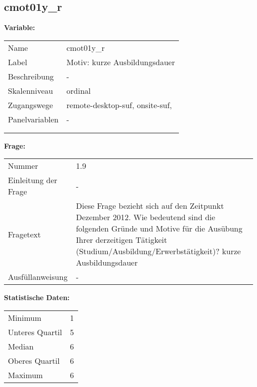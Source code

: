 	
	
	\subsection{cmot01y\_r}
	\label{subSection:cmot01y_r}

	\noindent\textbf{Variable:}\\
		\begin{tabular}{lL{11.3cm}}
			\label{tableVariable:cmot01y_r}
			Name & cmot01y\_r \\
			Label & Motiv: kurze Ausbildungsdauer \\
			Beschreibung & - \\
			Skalenniveau & ordinal \\
			Zugangswege &
				remote-desktop-suf,
				onsite-suf,
 \\
			Panelvariablen & -
			 \\
			 \\
 \\
		\end{tabular}

		\vspace*{1 cm}
		\noindent\textbf{Frage:}\\
		\begin{tabular}{lL{11.3cm}}
			\label{tableQuestion:cmot01y_r}
			Nummer & 1.9 \\
			Einleitung der Frage & - \\
			Fragetext & Diese Frage bezieht sich auf den Zeitpunkt Dezember 2012. Wie bedeutend sind die folgenden Gründe und Motive für die Ausübung Ihrer derzeitigen Tätigkeit (Studium/Ausbildung/Erwerbstätigkeit)?
kurze Ausbildungsdauer \\
			Ausfüllanweisung & - \\
		\end{tabular}


		\vspace*{1 cm}
		\noindent\textbf{Statistische Daten:}\\
			\begin{tabular}{ll}
				\label{tableStatistics:cmot01y_r}
					Minimum & 1 \\
					Unteres Quartil & 5 \\
					Median & 6 \\
					Oberes Quartil & 6 \\
					Maximum & 6 \\
			\end{tabular}



